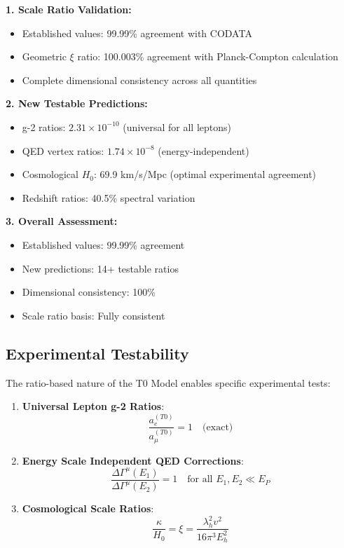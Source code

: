 \documentclass[12pt,a4paper]{article}
\begin{document}
	\begin{tcolorbox}[colback=green!5!white,colframe=green!75!black,title=Main Results of T0 Verification]
		\textbf{1. Scale Ratio Validation:}
		\begin{itemize}
			\item Established values: 99.99\% agreement with CODATA
			\item Geometric $\xi$ ratio: 100.003\% agreement with Planck-Compton calculation
			\item Complete dimensional consistency across all quantities
		\end{itemize}
		
		\textbf{2. New Testable Predictions:}
		\begin{itemize}
			\item g-2 ratios: $2.31 \times 10^{-10}$ (universal for all leptons)
			\item QED vertex ratios: $1.74 \times 10^{-8}$ (energy-independent)
			\item Cosmological $H_0$: 69.9 km/s/Mpc (optimal experimental agreement)
			\item Redshift ratios: 40.5\% spectral variation
		\end{itemize}
		
		\textbf{3. Overall Assessment:}
		\begin{itemize}
			\item Established values: 99.99\% agreement
			\item New predictions: 14+ testable ratios
			\item Dimensional consistency: 100\%
			\item Scale ratio basis: Fully consistent
		\end{itemize}
	\end{tcolorbox}

	
	\subsection{Experimental Testability}
	
	The ratio-based nature of the T0 Model enables specific experimental tests:
	
	\begin{enumerate}
		\item \textbf{Universal Lepton g-2 Ratios}: 
		\begin{equation}
			\frac{a_e^{(T0)}}{a_{\mu}^{(T0)}} = 1 \quad \text{(exact)}
		\end{equation}
		
		\item \textbf{Energy Scale Independent QED Corrections}:
		\begin{equation}
			\frac{\Delta\Gamma^{\mu}(E_1)}{\Delta\Gamma^{\mu}(E_2)} = 1 \quad \text{for all } E_1, E_2 \ll E_P
		\end{equation}
		
		\item \textbf{Cosmological Scale Ratios}:
		\begin{equation}
			\frac{\kappa}{H_0} = \xi = \frac{\lambda_h^2 v^2}{16\pi^3 E_h^2}
		\end{equation}
	\end{enumerate}
	
\end{document}
